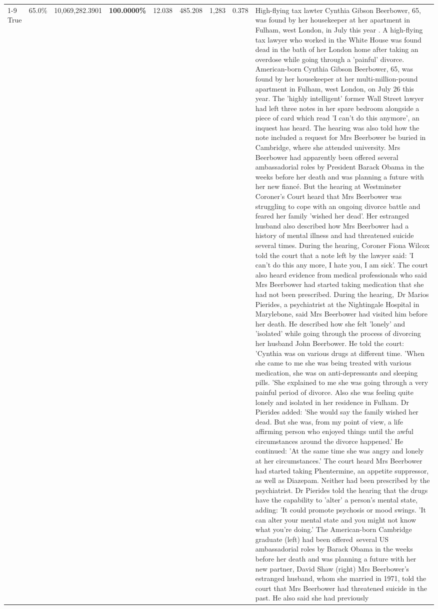 \begin{table}[H]
\begin{tabular}{lllrlllll}
\cline{1-9}
True & 65.0\% & 10,069,282.3901 & \bfseries \color{red} 100.0000\% & 12.038 & 485.208 & 1,283 & 0.378 & High-flying tax lawter Cynthia Gibson Beerbower, 65, was found by her housekeeper at her apartment in Fulham, west London, in July this year . A high-flying tax lawyer who worked in the White House was found dead in the bath of her London home after taking an overdose while going through a 'painful' divorce. American-born Cynthia Gibson Beerbower, 65, was found by her housekeeper at her multi-million-pound apartment in Fulham, west London, on July 26 this year. The 'highly intelligent' former Wall Street lawyer had left three notes in her spare bedroom alongside a piece of card which read 'I can't do this anymore', an inquest has heard. The hearing was also told how the note included a request for Mrs Beerbower be buried in Cambridge, where she attended university. Mrs Beerbower had apparently been offered several ambassadorial roles by President Barack Obama in the weeks before her death and was planning a future with her new fiancé. But the hearing at Westminster Coroner's Court heard that Mrs Beerbower was struggling to cope with an ongoing divorce battle and feared her family 'wished her dead'. Her estranged husband also described how Mrs Beerbower had a history of mental illness and had threatened suicide several times. During the hearing, Coroner Fiona Wilcox told the court that a note left by the lawyer said: 'I can't do this any more, I hate you, I am sick'. The court also heard evidence from medical professionals who said Mrs Beerbower had started taking medication that she had not been prescribed. During the hearing, Dr Marios Pierides, a psychiatrist at the Nightingale Hospital in Marylebone, said Mrs Beerbower had visited him before her death. He described how she felt 'lonely' and 'isolated' while going through the process of divorcing her husband John Beerbower. He told the court: 'Cynthia was on various drugs at different time. 'When she came to me she was being treated with various medication, she was on anti-depressants and sleeping pills. 'She explained to me she was going through a very painful period of divorce. Also she was feeling quite lonely and isolated in her residence in Fulham. Dr Pierides added: 'She would say the family wished her dead. But she was, from my point of view, a life affirming person who enjoyed things until the awful circumstances around the divorce happened.' He continued: 'At the same time she was angry and lonely at her circumstances.' The court heard Mrs Beerbower had started taking Phentermine, an appetite suppressor, as well as Diazepam. Neither had been prescribed by the psychiatrist. Dr Pierides told the hearing that the drugs have the capability to 'alter' a person's mental state, adding: 'It could promote psychosis or mood swings. 'It can alter your mental state and you might not know what you're doing.' The American-born Cambridge graduate (left) had been offered several US ambassadorial roles by Barack Obama in the weeks before her death and was planning a future with her new partner, David Shaw (right) Mrs Beerbower's estranged husband, whom she married in 1971, told the court that Mrs Beerbower had threatened suicide in the past. He also said she had previously 
\end{tabular}
\end{table}
